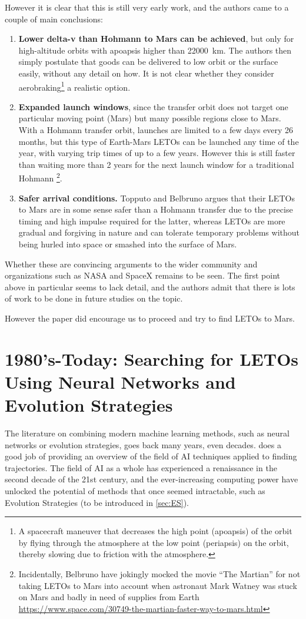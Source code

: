However it is clear that this is still very early work, and the authors came to a couple of main conclusions:
\begin{enumerate}
	\item \textbf{Lower delta-v than Hohmann to Mars can be achieved}, but only for high-altitude orbits with apoapsis higher than \SI{22000}{\km}. The authors then simply postulate that goods can be delivered to low orbit or the surface easily, without any detail on how. It is not clear whether they consider aerobraking\footnote{A spacecraft maneuver that decreases the high point (apoapsis) of the orbit by flying through the atmosphere at the low point (periapsis) on the orbit, thereby slowing due to friction with the atmosphere.} a realistic option.
	\item \textbf{Expanded launch windows}, since the transfer orbit does not target one particular moving point (Mars) but many possible regions close to Mars. With a Hohmann transfer orbit, launches are limited to a few days every 26 months, but this type of Earth-Mars LETOs can be launched any time of the year, with varying trip times of up to a few years. However this is still faster than waiting more than 2 years for the next launch window for a traditional Hohmann \footnote{Incidentally, Belbruno have jokingly mocked the  movie ``The Martian'' for not taking LETOs to Mars into account when astronaut Mark Watney was stuck on Mars and badly in need of supplies from Earth \url{https://www.space.com/30749-the-martian-faster-way-to-mars.html}}.
	\item \textbf{Safer arrival conditions.} Topputo and Belbruno argues that their LETOs to Mars are in some sense safer than a Hohmann transfer due to the precise timing and high impulse required for the latter, whereas LETOs are more gradual and forgiving in nature and can tolerate temporary problems without being hurled into space or smashed into the surface of Mars.
\end{enumerate}
Whether these are convincing arguments to the wider community and organizations such as NASA and SpaceX remains to be seen. The first point above in particular seems to lack detail, and the authors admit that there is lots of work to be done in future studies on the topic.

However the paper did encourage us to proceed and try to find LETOs to Mars.

\section{1980's-Today: Searching for LETOs Using Neural Networks and Evolution Strategies}
The literature on combining modern machine learning methods, such as neural networks or evolution strategies, goes back many years, even decades. \cite{Izzo2018} does a good job of providing an overview of the field of AI techniques applied to finding trajectories. The field of AI as a whole has experienced a renaissance in the second decade of the 21st century, and the ever-increasing computing power have unlocked the potential of methods that once seemed intractable, such as Evolution Strategies \cite{Salimans2017} (to be introduced in \cref{sec:ES}).

